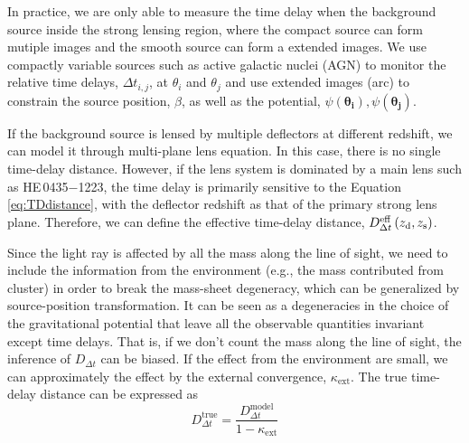 \documentclass[fleqn,usenatbib]{mnras}
\newcommand\he{HE\,0435$-$1223}
\def\zd{z_{\rm d}}
\def\zs{z_{\rm s}}
\def\dt{D_{\Delta t}}
\begin{document}
In practice, we are only able to measure the time delay when the background source inside the strong lensing region, where the compact source can form mutiple images and the smooth source can form a extended images. We use compactly variable sources such as active galactic nuclei (AGN) to monitor the relative time delays, $\Delta t_{i,j}$, at $\theta_{i}$ and $\theta_{j}$ and use extended images (arc) to constrain the source position, $\beta$, as well as the potential, $\psi\left(\boldsymbol{\theta_{i}}\right), \psi\left(\boldsymbol{\theta_{j}}\right)$.






If the background source is lensed by multiple deflectors at different redshift, we can model it through multi-plane lens equation. \citep[e.g.,][]{BlandfordNarayan86,SEF92,Collett&Auger14,McCullyEtal14} In this case, there is no single time-delay distance. However, if the lens system is dominated by a main lens such as \he, the time delay is primarily sensitive to the Equation \ref{eq:TDdistance}, with the deflector redshift as that of the primary strong lens plane. Therefore, we can define the effective time-delay distance, $\dt^{\textrm{eff}}\left(\zd,\zs\right)$. \citep{WongEtal16}

Since the light ray is affected by all the mass along the line of sight, we need to include the information from the environment (e.g., the mass contributed from cluster) in order to break the mass-sheet degeneracy, which can be generalized by source-position transformation. It can be seen as a degeneracies in the choice of the gravitational potential that leave all the observable quantities invariant except time delays. That is, if we don't count the mass along the line of sight, the inference of $\dt$ can be biased. If the effect from the environment are small, we can approximately the effect by the external convergence, $\kappa_{\textrm{ext}}$. The true time-delay distance can be expressed as
\begin{equation}
\dt^{\textrm{true}}=\frac{\dt^{\textrm{model}}}{1-\kappa_{\textrm{ext}}}
\end{equation}
\end{document}
